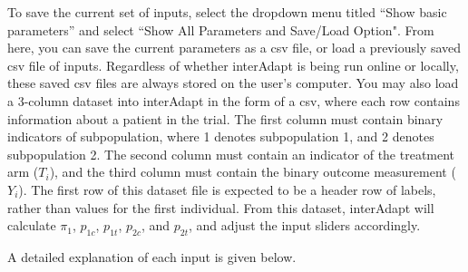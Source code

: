 \documentclass{article}
\newcommand{\interAdapt}{\textsf{interAdapt }}
\begin{document}
To save the current set of inputs, select the dropdown menu titled “Show basic parameters” and select “Show All Parameters and Save/Load Option". From here, you can save the current parameters as a csv file, or load a previously saved csv file of inputs. Regardless of whether \interAdapt is being run online or locally, these saved csv files are always stored on the user's computer. You may also load a 3-column dataset into \interAdapt in the form of a csv, where each row contains information about a patient in the trial. The first column must contain binary indicators of subpopulation, where 1 denotes subpopulation 1, and 2 denotes subpopulation 2. The second column must contain an indicator of the treatment arm ($T_i$), and the third column must contain the binary outcome measurement ($Y_i$). The first row of this dataset file is expected to be a header row of labels, rather than values for the first individual. From this dataset, \interAdapt will calculate $π_1$, $p_{1c}$, $p_{1t}$, $p_{2c}$, and $p_{2t}$, and adjust the input sliders accordingly.

A detailed explanation of each input is given below.
\end{document}
